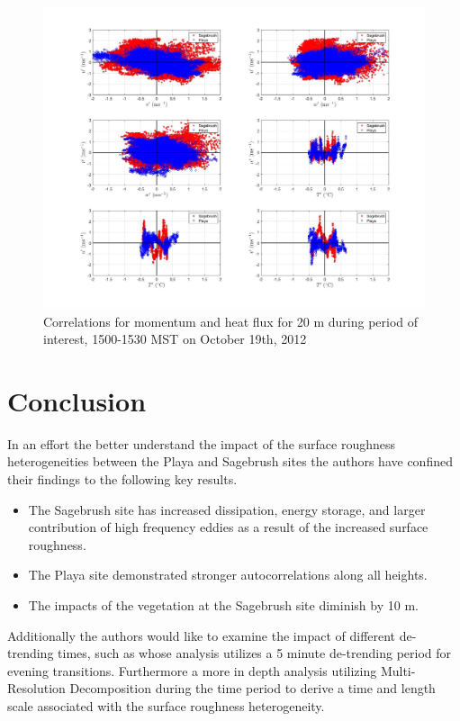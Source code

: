 \documentclass[]{article}
\begin{document}
\begin{figure}
	\centering
	\includegraphics[width=\textwidth]{momentum_corr_20m}
		\caption{Correlations for momentum and heat flux for 20 m during period of interest, 1500-1530 MST on October 19th, 2012}
	\label{fig:mom_20}
\end{figure}



\section{Conclusion}
 In an effort the better understand the impact of the surface roughness heterogeneities between the Playa and Sagebrush sites the authors have confined their findings to the following key results. 
 \begin{itemize}
 	\item
 	The Sagebrush site has increased dissipation, energy storage, and larger contribution of high frequency eddies as a result of the increased surface roughness.
 	\item
 	The Playa site demonstrated stronger autocorrelations along all heights.
 	\item 
 	The impacts of the vegetation at the Sagebrush site diminish by 10 m.
 \end{itemize}
 
 
 Additionally the authors would like to examine the impact of different de-trending times, such as \cite{} whose analysis utilizes a 5 minute de-trending period for evening transitions. Furthermore a more in depth analysis utilizing Multi-Resolution Decomposition during the time period  to derive a time and length scale associated with the surface roughness heterogeneity. 

\newpage


\end{document}
